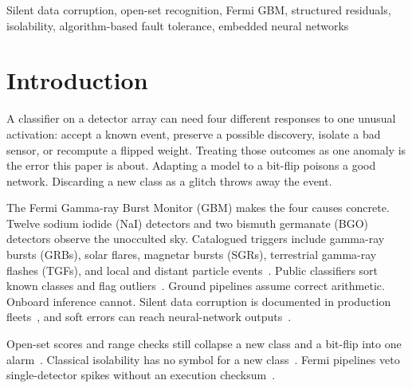 \documentclass{ieeeaccess}
\begin{document}
\begin{keywords}
Silent data corruption, open-set recognition, Fermi GBM, structured residuals, isolability, algorithm-based fault tolerance, embedded neural networks
\end{keywords}

\titlepgskip=-15pt
\maketitle
\setlength{\textfloatsep}{7pt plus 2pt minus 2pt}
\setlength{\floatsep}{7pt plus 2pt minus 2pt}
\setlength{\intextsep}{7pt plus 2pt minus 2pt}
\setlength{\dbltextfloatsep}{7pt plus 2pt minus 2pt}
\setlength{\dblfloatsep}{7pt plus 2pt minus 2pt}
\setlength{\abovecaptionskip}{2pt}
\setlength{\belowcaptionskip}{-2pt}

\section{Introduction}

A classifier on a detector array can need four different responses to one unusual activation: accept a known event, preserve a possible discovery, isolate a bad sensor, or recompute a flipped weight. Treating those outcomes as one anomaly is the error this paper is about. Adapting a model to a bit-flip poisons a good network. Discarding a new class as a glitch throws away the event.

The Fermi Gamma-ray Burst Monitor (GBM) makes the four causes concrete. Twelve sodium iodide (NaI) detectors and two bismuth germanate (BGO) detectors observe the unocculted sky. Catalogued triggers include gamma-ray bursts (GRBs), solar flares, magnetar bursts (SGRs), terrestrial gamma-ray flashes (TGFs), and local and distant particle events~\cite{meegan2009,vonkienlin2020,bhat2016,roberts2018,briggs2013}. Public classifiers sort known classes and flag outliers~\cite{john2025}. Ground pipelines assume correct arithmetic. Onboard inference cannot. Silent data corruption is documented in production fleets~\cite{dixit2021,hochschild2021,dixit2022}, and soft errors can reach neural-network outputs~\cite{li2017,reagen2018}.

Open-set scores and range checks still collapse a new class and a bit-flip into one alarm~\cite{gavarini2022,progip2025,drdna2024,geissler2023,react2021}. Classical isolability has no symbol for a new class~\cite{gertler1990,venkatasubramanian2003,isermann2005}. Fermi pipelines veto single-detector spikes without an execution checksum~\cite{paciesas2012,goldstein2019,perera2025}.
\end{document}
